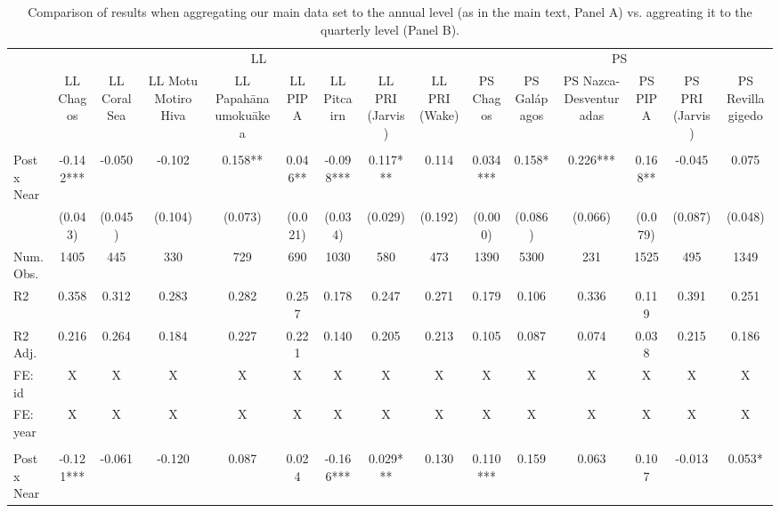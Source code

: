 \begin{table}

\caption{Comparison of results when aggregating our main data set to the annual level (as in the main text, Panel A) vs. aggreating it to the quarterly level (Panel B).}
\centering
\begin{tabular}[t]{lcccccccccccccc}
\toprule
\multicolumn{1}{c}{ } & \multicolumn{8}{c}{LL} & \multicolumn{6}{c}{PS} \\
\cmidrule(l{3pt}r{3pt}){2-9} \cmidrule(l{3pt}r{3pt}){10-15}
 & LL Chagos & LL Coral Sea & LL Motu Motiro Hiva & LL Papahānaumokuākea & LL PIPA & LL Pitcairn & LL PRI (Jarvis) & LL PRI (Wake) & PS Chagos & PS Galápagos & PS Nazca-Desventuradas & PS PIPA & PS PRI (Jarvis) & PS Revillagigedo\\
\midrule
\addlinespace[0.3em]
\multicolumn{15}{l}{Panel A: Aggregating data to the year-flag level (form main text)}\\
\hspace{1em}Post x Near & -0.142*** & -0.050 & -0.102 & 0.158** & 0.046** & -0.098*** & 0.117*** & 0.114 & 0.034*** & 0.158* & 0.226*** & 0.168** & -0.045 & 0.075\\
\hspace{1em} & (0.043) & (0.045) & (0.104) & (0.073) & (0.021) & (0.034) & (0.029) & (0.192) & (0.000) & (0.086) & (0.066) & (0.079) & (0.087) & (0.048)\\
\hspace{1em}Num.Obs. & 1405 & 445 & 330 & 729 & 690 & 1030 & 580 & 473 & 1390 & 5300 & 231 & 1525 & 495 & 1349\\
\hspace{1em}R2 & 0.358 & 0.312 & 0.283 & 0.282 & 0.257 & 0.178 & 0.247 & 0.271 & 0.179 & 0.106 & 0.336 & 0.119 & 0.391 & 0.251\\
\hspace{1em}R2 Adj. & 0.216 & 0.264 & 0.184 & 0.227 & 0.221 & 0.140 & 0.205 & 0.213 & 0.105 & 0.087 & 0.074 & 0.038 & 0.215 & 0.186\\
\hspace{1em}FE: id & X & X & X & X & X & X & X & X & X & X & X & X & X & \vphantom{1} X\\
\hspace{1em}FE: year & X & X & X & X & X & X & X & X & X & X & X & X & X & \vphantom{1} X\\
\addlinespace[0.5cm]
\multicolumn{15}{l}{Panel B: Aggregatign data to tye year-quarter-flag level}\\
\hspace{1em}Post x Near & -0.121*** & -0.061 & -0.120 & 0.087 & 0.024 & -0.166*** & 0.029*** & 0.130 & 0.110*** & 0.159 & 0.063 & 0.107 & -0.013 & 0.053*\\

\end{tabular}
\end{table}
